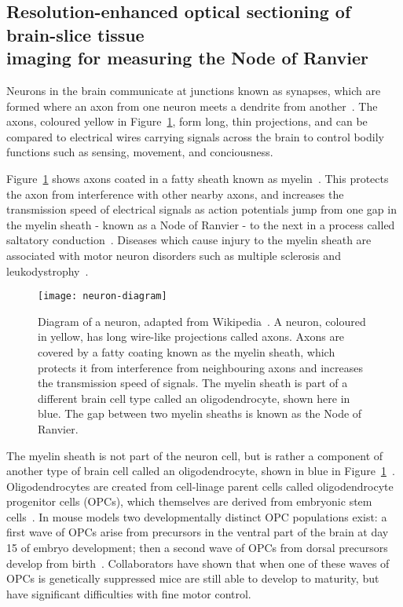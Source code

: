 \subsection[Resolution-enhanced optical sectioning of brain-slice tissue imaging for measuring the Node of Ranvier]{Resolution-enhanced optical sectioning of brain-slice tissue\\ imaging for measuring the Node of Ranvier}
Neurons in the brain communicate at junctions known as synapses, which are formed where an axon from one neuron meets a dendrite from another~\cite{hall1992introduction}.
The axons, coloured yellow in Figure~\ref{fig:neuron-diagram}, form long, thin projections, and can be compared to electrical wires carrying signals across the brain to control bodily functions such as sensing, movement, and conciousness.

Figure~\ref{fig:neuron-diagram} shows axons coated in a fatty sheath known as myelin~\cite{hall1992introduction}.
This protects the axon from interference with other nearby axons, and increases the transmission speed of electrical signals as action potentials jump from one gap in the myelin sheath - known as a Node of Ranvier - to the next in a process called saltatory conduction~\cite{tasaki1939electro}.
Diseases which cause injury to the myelin sheath are associated with motor neuron disorders such as multiple sclerosis and leukodystrophy~\cite{suzuki2001demyelinating}.

\begin{figure}[htbp!]
\centering
\texttt{[image: neuron-diagram]}
\caption[LAG SIM: Diagram of a neuron showing an axon protected by the myelin sheath]{Diagram of a neuron, adapted from Wikipedia~\cite{wikineuron}. A neuron, coloured in yellow, has long wire-like projections called axons. Axons are covered by a fatty coating known as the myelin sheath, which protects it from interference from neighbouring axons and increases the transmission speed of signals. The myelin sheath is part of a different brain cell type called an oligodendrocyte, shown here in blue. The gap between two myelin sheaths is known as the Node of Ranvier. }
\label{fig:neuron-diagram}
\end{figure}
\afterpage{\clearpage}

The myelin sheath is not part of the neuron cell, but is rather a component of another type of brain cell called an oligodendrocyte, shown in blue in Figure~\ref{fig:neuron-diagram}~\cite{hammond2012cellular}.
Oligodendrocytes are created from cell-linage parent cells called oligodendrocyte progenitor cells (OPCs), which themselves are derived from embryonic stem cells~\cite{goldman2015make}.
In mouse models two developmentally distinct OPC populations exist: a first wave of OPCs arise from precursors in the ventral part of the brain at day 15 of embryo development; then a second wave of OPCs from dorsal precursors develop from birth~\cite{kessaris2006competing}.
Collaborators have shown that when one of these waves of OPCs is genetically suppressed mice are still able to develop to maturity, but have significant difficulties with fine motor control.


